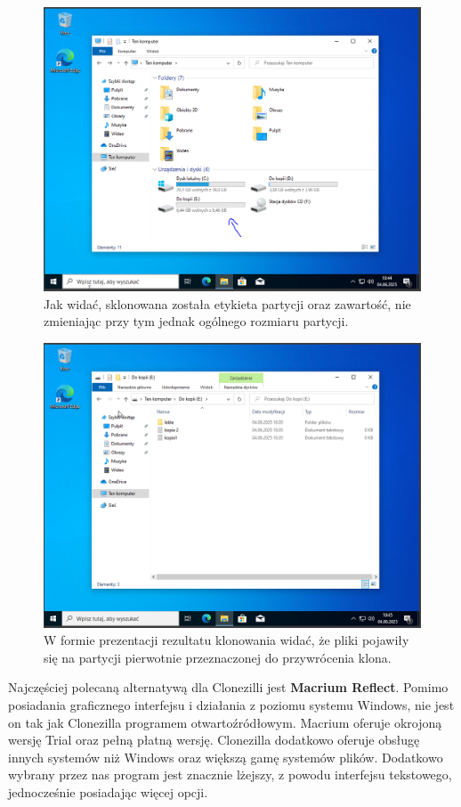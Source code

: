 \documentclass[0.82pt,a4paper]{article}
\begin{document}
    \begin{figure}[H]
        \centering
        \includegraphics[width=0.8\linewidth]{media/Clonezilla/clone13.PNG}
        \caption[clone rezultat]{Jak widać, sklonowana została etykieta partycji oraz zawartość, nie zmieniając przy tym jednak ogólnego rozmiaru partycji.}
        \label{fig:clone13}
    \end{figure}
    
    \begin{figure}[H]
        \centering
        \includegraphics[width=0.8\linewidth]{media/Clonezilla/clone14.PNG}
        \caption[clone prezentacja]{W formie prezentacji rezultatu klonowania widać, że pliki pojawiły się na partycji pierwotnie przeznaczonej do przywrócenia klona.}
        \label{fig:clone14}
    \end{figure}
    Najczęściej polecaną alternatywą dla Clonezilli jest \textbf{Macrium Reflect}. Pomimo posiadania graficznego interfejsu i działania z poziomu systemu Windows, nie jest on tak jak Clonezilla programem otwartoźródłowym. Macrium oferuje okrojoną wersję Trial oraz pełną płatną wersję. Clonezilla dodatkowo oferuje obsługę innych systemów niż Windows oraz większą gamę systemów plików. Dodatkowo wybrany przez nas program jest znacznie lżejszy, z powodu interfejsu tekstowego, jednocześnie posiadając więcej opcji.
\end{document}
